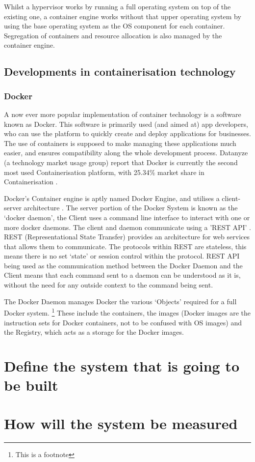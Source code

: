 Whilst a hypervisor works by running a full operating system on top of the existing one, a container engine works without that upper operating system by using the base operating system as the OS component for each container. Segregation of containers and resource allocation is also managed by the container engine.

\section{Developments in containerisation technology}

\subsection{Docker}
A now ever more popular implementation of container technology is a software known as Docker. This software is primarily used (and aimed at) app developers, who can use the platform to quickly create and deploy applications for businesses. The use of containers is supposed to make managing these applications much easier, and ensures compatibility along the whole development process.
Datanyze (a technology market usage group) report that Docker is currently the second most used Containerisation platform, with 25.34\% market share in Containerisation \citep{datanyze}. 

Docker's Container engine is aptly named Docker Engine, and utilises a client-server architecture \citep{DockerArchitecture}. The server portion of the Docker System is known as the `docker daemon', the Client uses a command line interface to interact with one or more docker daemons. The client and daemon communicate using a 'REST API' \citep{DockerArchitecture}. REST (Representational State Transfer) provides an architecture for web services \citep{W3Architecture2004} that allows them to communicate. The protocols within REST are stateless, this means there is no set `state' or session control within the protocol. REST API being used as the communication method between the Docker Daemon and the Client means that each command sent to a daemon can be understood as it is, without the need for any outside context to the command being sent.

The Docker Daemon manages Docker the various `Objects' \citep{DockerArchitecture} required for a full Docker system. \footnote{This is a footnote} These include the containers, the images (Docker images are the instruction sets for Docker containers, not to be confused with OS images) and the Registry, which acts as a storage for the Docker images.


\chapter{Define the system that is going to be built}



\chapter{How will the system be measured}
